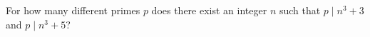 For how many different primes $p$ does there exist an integer $n$ such that $p\mid n^3+3$ and $p\mid n^3+5$?
